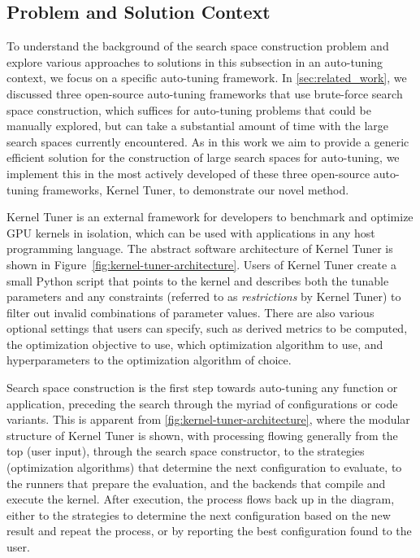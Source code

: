 \subsection{Problem and Solution Context} \label{subsec:searchspace_construction_context}
To understand the background of the search space construction problem and explore various approaches to solutions in this subsection in an auto-tuning context, we focus on a specific auto-tuning framework.
In \cref{sec:related_work}, we discussed three open-source auto-tuning frameworks that use brute-force search space construction, which suffices for auto-tuning problems that could be manually explored, but can take a substantial amount of time with the large search spaces currently encountered. 
As in this work we aim to provide a generic efficient solution for the construction of large search spaces for auto-tuning, we implement this in the most actively developed of these three open-source auto-tuning frameworks, Kernel Tuner, to demonstrate our novel method.

Kernel Tuner is an external framework for developers to benchmark and optimize GPU kernels in isolation, which can be used with applications in any host programming language. 
The abstract software architecture of Kernel Tuner is shown in Figure~\ref{fig:kernel-tuner-architecture}. Users of Kernel Tuner create a small Python script that points to the kernel and describes both the tunable parameters and any constraints (referred to as {\em restrictions} by Kernel Tuner) to filter out invalid combinations of parameter values. 
There are also various optional settings that users can specify, such as derived metrics to be computed, the optimization objective to use, which optimization algorithm to use, and hyperparameters to the optimization algorithm of choice. 

Search space construction is the first step towards auto-tuning any function or application, preceding the search through the myriad of configurations or code variants. This is apparent from \cref{fig:kernel-tuner-architecture}, where the modular structure of Kernel Tuner is shown, with processing flowing generally from the top (user input), through the search space constructor, to the strategies (optimization algorithms) that determine the next configuration to evaluate, to the runners that prepare the evaluation, and the backends that compile and execute the kernel. After execution, the process flows back up in the diagram, either to the strategies to determine the next configuration based on the new result and repeat the process, or by reporting the best configuration found to the user. 

